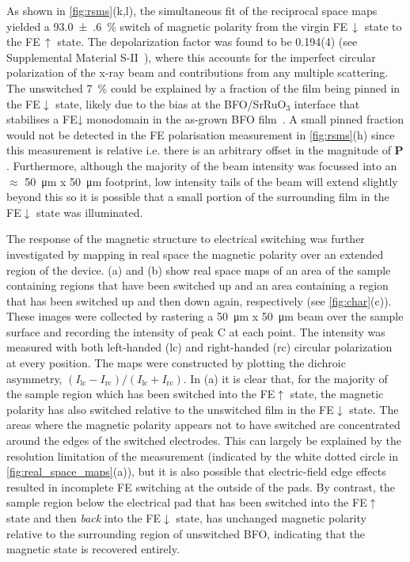 \documentclass[aps,prb,twocolumn,showpacs,superscriptaddress, longbibliography, 10pt]{revtex4-1}
\begin{document}
{As shown in \cref{fig:rsms}(k,l), the simultaneous fit of the reciprocal space maps yielded a \SI{93.0(6)}{\percent} switch of magnetic polarity from the virgin FE\,$\downarrow$ state to the FE\,$\uparrow$ state. The depolarization factor was found to be 0.194(4) (see Supplemental Material S-II~\cite{Suppl}), where this accounts for the imperfect circular polarization of the x-ray beam and contributions from any multiple scattering. The unswitched \SI{7}{\percent} could be explained by a fraction of the film being pinned in the FE$\downarrow$ state, likely due to the bias at the BFO/SrRuO$_3$ interface that stabilises a FE↓ monodomain in the as-grown BFO film~\cite{fong2006stabilization,giencke2014tailoring}. A small pinned fraction would not be detected in the FE polarisation measurement in \cref{fig:rsms}(h) since this measurement is relative i.e. there is an arbitrary offset in the magnitude of $\mathbf{P}$. Furthermore, although the majority of the beam intensity was focussed into an $\approx$ \SI{50}{\micro\metre} x \SI{50}{\micro\metre} footprint, low intensity tails of the beam will extend slightly beyond this so it is possible that a small portion of the surrounding film in the FE$\downarrow$ state was illuminated.

The response of the magnetic structure to electrical switching was further investigated by mapping in real space the magnetic polarity over an extended region of the device. (a) and (b) show real space maps of an area of the sample containing regions that have been switched up and an area containing a region that has been switched up and then down again, respectively (see \cref{fig:char}(c)). These images were collected by rastering a \SI{50}{\micro\metre} x \SI{50}{\micro\metre} beam over the sample surface and recording the intensity of peak C at each point. The intensity was measured with both left-handed (lc) and right-handed (rc) circular polarization at every position. The maps were constructed by plotting the dichroic asymmetry, $(I_\mathrm{lc} - I_\mathrm{rc})/(I_\mathrm{lc} + I_\mathrm{rc})$. In (a) it is clear that, for the majority of the sample region which has been switched into the FE$\uparrow$ state, the magnetic polarity has also switched relative to the unswitched film in the FE$\downarrow$ state. The areas where the magnetic polarity appears not to have switched are concentrated around the edges of the switched electrodes. This can largely be explained by the resolution limitation of the measurement (indicated by the white dotted circle in \cref{fig:real_space_maps}(a)), but it is also possible that electric-field edge effects resulted in incomplete FE switching at the outside of the pads. By contrast, the sample region below the electrical pad that has been switched into the FE$\uparrow$ state and then \emph{back} into the FE$\downarrow$ state, has unchanged magnetic polarity relative to the surrounding region of unswitched BFO, indicating that the magnetic state is recovered entirely.

}
\end{document}

